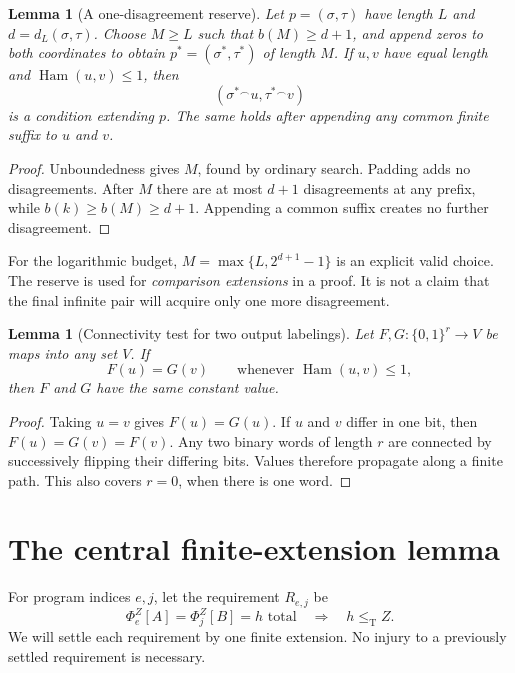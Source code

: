\documentclass[11pt,a4paper]{article}
\newcommand{\leT}{\leq_{\mathrm T}}
\newcommand{\bits}{\{0,1\}}
\newcommand{\cat}{\mathbin{{}^{\frown}}}
\newcommand{\hd}{\operatorname{Ham}}
\newcommand{\phiZ}[2]{\Phi_{#1}^{Z}[#2]}
\newtheorem{lemma}[theorem]{Lemma}
\theoremstyle{definition}\newtheorem{definition}[theorem]{Definition}
\theoremstyle{remark}\newtheorem{remark}[theorem]{Remark}
\begin{document}
\begin{lemma}[A one-disagreement reserve]
\label{lem:cushion}
Let $p=(\sigma,\tau)$ have length $L$ and $d=d_L(\sigma,\tau)$. Choose $M\ge L$ such that $b(M)\ge d+1$, and append zeros to both coordinates to obtain $p^*=(\sigma^*,\tau^*)$ of length $M$. If $u,v$ have equal length and $\hd(u,v)\le1$, then
\begin{equation}\label{eq:onebit}
                  (\sigma^*\cat u,\tau^*\cat v)
\end{equation}
is a condition extending $p$. The same holds after appending any common finite suffix to $u$ and $v$.
\end{lemma}
\begin{proof}
Unboundedness gives $M$, found by ordinary search. Padding adds no disagreements. After $M$ there are at most $d+1$ disagreements at any prefix, while $b(k)\ge b(M)\ge d+1$. Appending a common suffix creates no further disagreement.
\end{proof}

For the logarithmic budget, $M=\max\{L,2^{d+1}-1\}$ is an explicit valid choice. The reserve is used for \emph{comparison extensions} in a proof. It is not a claim that the final infinite pair will acquire only one more disagreement.

\begin{lemma}[Connectivity test for two output labelings]
\label{lem:cube}
Let $F,G:\bits^r\to V$ be maps into any set $V$. If
\[
       F(u)=G(v)\qquad\text{whenever }\hd(u,v)\le1,
\]
then $F$ and $G$ have the same constant value.
\end{lemma}
\begin{proof}
Taking $u=v$ gives $F(u)=G(u)$. If $u$ and $v$ differ in one bit, then $F(u)=G(v)=F(v)$. Any two binary words of length $r$ are connected by successively flipping their differing bits. Values therefore propagate along a finite path. This also covers $r=0$, when there is one word.
\end{proof}

\section{The central finite-extension lemma}
\label{sec:dichotomy}

For program indices $e,j$, let the requirement $R_{e,j}$ be
\begin{equation}\label{eq:requirement}
 \phiZ{e}{A}=\phiZ{j}{B}=h\text{ total}
                \quad\Longrightarrow\quad h\leT Z.
\end{equation}
We will settle each requirement by one finite extension. No injury to a previously settled requirement is necessary.
\end{document}
